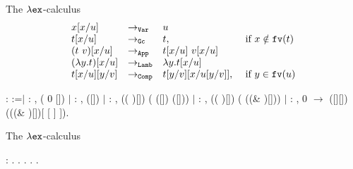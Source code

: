 \documentclass[10pt]{beamer}
\newcommand{\fv}[1]{{\tt fv}(#1)}
\begin{document}
  \begin{frame}[fragile]{The $\lambda{\tt ex}$-calculus}
  $$\begin{array}{llll}
      x[x/u] & \to_{\tt Var} & u & \\      
      t[x/u] & \to_{\tt Gc} & t, & \mbox{ if } x \notin\fv{t} \\      
      (t\ v)[x/u] & \to_{\tt App} & t[x/u]\ v[x/u] & \\
      (\lambda y. t)[x/u] & \to_{\tt Lamb} & \lambda y.t[x/u] & \\
      t[x/u][y/v] & \to_{\tt Comp} & t[y/v][x/u[y/v]], & \mbox{ if } y \in\fv{u}            
      \end{array}$$
  \begin{coqdoccode}
      : 
     :=\coqdoceol \coqdocnoindent \ensuremath{|}
     : \coqdockw{\ensuremath{\forall}}
    ,  ( 0
    []) \coqdoceol \coqdocnoindent
    \ensuremath{|}  :
    \coqdockw{\ensuremath{\forall}}  ,
     ([])
    \coqdoceol \coqdocnoindent \ensuremath{|}
     : \coqdockw{\ensuremath{\forall}}
      , \coqdoceol
    \coqdocindent{1.00em}  ((
     )[])
    ( ([])
    ([]))\coqdoceol \coqdocnoindent
    \ensuremath{|}  :
    \coqdockw{\ensuremath{\forall}}  ,
    \coqdoceol \coqdocindent{1.00em} 
    (( )[])
    ( ((\&
    )[]))\coqdoceol \coqdocnoindent
    \ensuremath{|}  :
    \coqdockw{\ensuremath{\forall}}  
    ,  0 
    \ensuremath{\rightarrow}\coqdoceol \coqdocindent{1.00em}
     ([][])
    (((\& )[])[ [ 
    ] ]).\coqdoceol
  \end{coqdoccode}
\end{frame}

    \begin{frame}[fragile]{The $\lambda{\tt ex}$-calculus}
  \begin{coqdoccode}
 :  .\coqdoceol
\coqdocnoindent
{}.\coqdoceol
\coqdocindent{1.00em}
 .\coqdoceol
\coqdocindent{1.00em}
 .\coqdoceol
\coqdocnoindent
{}.\coqdoceol
\end{coqdoccode}
\end{frame}
\end{document}
